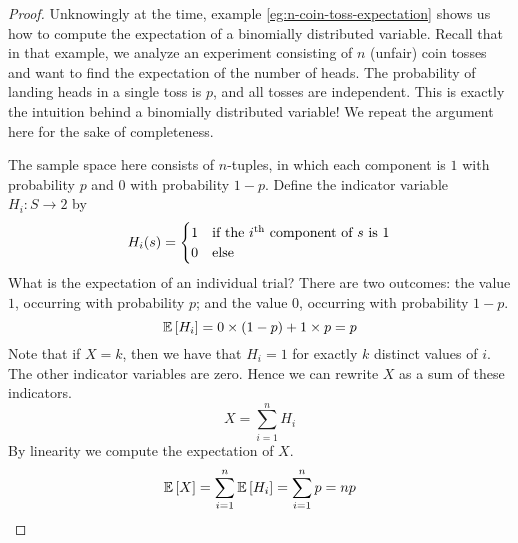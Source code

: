\documentclass[11pt]{article}
\begin{document}
\begin{proof}
    Unknowingly at the time, example \ref{eg:n-coin-toss-expectation} shows us
    how to compute the expectation of a binomially distributed variable.
    Recall that in that example, we analyze an experiment consisting of $n$
    (unfair) coin tosses and want to find the expectation of the number of
    heads. The probability of landing heads in a single toss is $p$, and all
    tosses are independent.
    This is exactly the intuition behind a binomially distributed variable!
    We repeat the argument here for the sake of completeness.

    The sample space here consists of $n$-tuples, in which each component is
    $1$ with probability $p$ and $0$ with probability $1-p$.
    Define the indicator variable $H_i : S \to 2$ by
    \begin{equation*}
        H_i(s) = \begin{cases}
            1 & \text{if the $i$\textsuperscript{th}{} component of $s$ is $1$} \\
            0 & \text{else}
        \end{cases}
    \end{equation*}
    What is the expectation of an individual trial? There are two outcomes: the
    value $1$, occurring with probability $p$; and the value $0$, occurring
    with probability $1-p$.
    \begin{equation*}
        \operatorname{\mathbb{E}}{\left[H_i\right]} = 0 \times (1-p) + 1 \times p = p
    \end{equation*}
    Note that if $X = k$, then we have that $H_i = 1$ for exactly $k$ distinct
    values of $i$.
    The other indicator variables are zero.
    Hence we can rewrite $X$ as a sum of these indicators.
    \begin{equation*}
        X = \sum_{i=1}^n H_i
    \end{equation*}
    By linearity we compute the expectation of $X$.
    \begin{equation*}
        \operatorname{\mathbb{E}}{\left[X\right]} = \sum_{i=1}^n \operatorname{\mathbb{E}}{\left[H_i\right]} = \sum_{i=1}^n p = np
    \end{equation*}


\end{proof}
\end{document}
